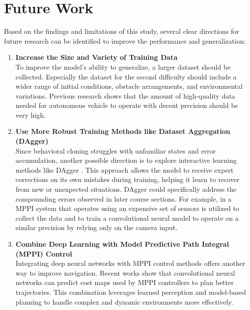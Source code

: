 \section{Future Work}
\label{sec:future_work}

Based on the findings and limitations of this study, several clear directions for future research can be identified to improve the performance and generalization:

\begin{enumerate}
  \item \textbf{Increase the Size and Variety of Training Data} \\
    To improve the model’s ability to generalize, a larger dataset should be collected. Especially the dataset for the second difficulty should include a wider range of initial conditions, obstacle arrangements, and environmental variations. Previous research \autocite{KALRA2016182} shows that the amount of high-quality data needed for autonomous vehicle to operate with decent precision should be very high.

  \item \textbf{Use More Robust Training Methods like Dataset Aggregation (DAgger)} \\
    Since behavioral cloning struggles with unfamiliar states and error accumulation, another possible direction is to explore interactive learning methods like DAgger \autocite{ross2011reduction}. This approach allows the model to receive expert corrections on its own mistakes during training, helping it learn to recover from new or unexpected situations. DAgger could specifically address the compounding errors observed in later course sections. For example, in \autocite{pan2019agileautonomousdrivingusing} a MPPI system that operates using an expensive set of sensors is utilized to collect the data and to train a convolutional neural model to operate on a similar precision by relying only on the camera input.

  \item \textbf{Combine Deep Learning with Model Predictive Path Integral (MPPI) Control} \\
    Integrating deep neural networks with MPPI control methods offers another way to improve navigation. Recent works \autocite{lee2021approximateinversereinforcementlearning, drews2017aggressivedeepdrivingmodel} show that convolutional neural networks can predict cost maps used by MPPI controllers to plan better trajectories. This combination leverages learned perception and model-based planning to handle complex and dynamic environments more effectively.


\end{enumerate}
